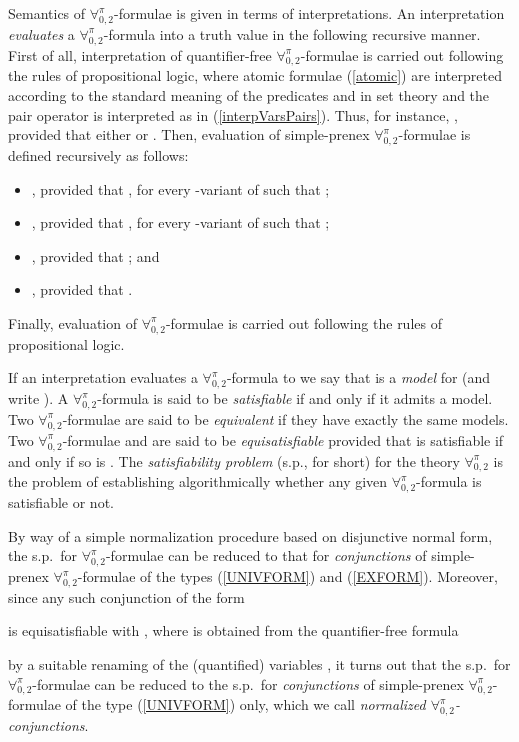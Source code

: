 \documentclass[submission,copyright,creativecommons]{eptcs}
\newcommand{\Lang}{\ensuremath{\mathbf{\forall}^{\pi}_{0,2}}\xspace}
\begin{document}
Semantics of \Lang-formulae is given in terms of interpretations.  An
interpretation  \emph{evaluates} a
\Lang-formula  into a truth value  in the following recursive manner.
First of all, interpretation of quantifier-free \Lang-formulae is
carried out following the rules of propositional logic, where atomic
formulae (\ref{atomic}) are interpreted according to the standard
meaning of the predicates  and  in set theory and the pair
operator  is interpreted as in (\ref{interpVarsPairs}).
Thus, for instance, , provided that either  or .
Then, evaluation of simple-prenex \Lang-formulae is defined
recursively as follows:
\begin{itemize}
  \item , provided that
  , for every -variant  of
   such that ;
  
  \item ,
  provided that , for every
  -variant  of  such that ;  
  
  \item , provided that
  ; and 
  
  \item ,
  provided that .
\end{itemize}
Finally, evaluation of \Lang-formulae is carried out following the
rules of propositional logic.  

If an interpretation  evaluates a \Lang-formula to  we
say that  is a \emph{model} for  (and write ).  
A \Lang-formula  is said to be \emph{satisfiable} if and only
if it admits a model.  
Two \Lang-formulae are said to be
\emph{equivalent} if they have exactly the same models.
Two \Lang-formulae  and  are
said to be \emph{equisatisfiable} provided that  is
satisfiable if and only if so is .  
The \emph{satisfiability
problem} (s.p., for short) for the theory \Lang is the problem of
establishing algorithmically whether any given \Lang-formula is
satisfiable or not.

By way of a simple normalization procedure based on disjunctive normal
form, the s.p.\ for \Lang-formulae can be reduced to
that for \emph{conjunctions} of simple-prenex \Lang-formulae of the
types (\ref{UNIVFORM}) and (\ref{EXFORM}).  Moreover, since any such
conjunction of the form

is equisatisfiable with , where
 is obtained from the quantifier-free formula

by a suitable
renaming of the (quantified) variables
, 
it turns out that the s.p.\ for \Lang-formulae can be
reduced to the s.p.\ for \emph{conjunctions} of
simple-prenex \Lang-formulae of the type (\ref{UNIVFORM}) only, which
we call \emph{normalized \Lang-conjunctions}.
\end{document}
